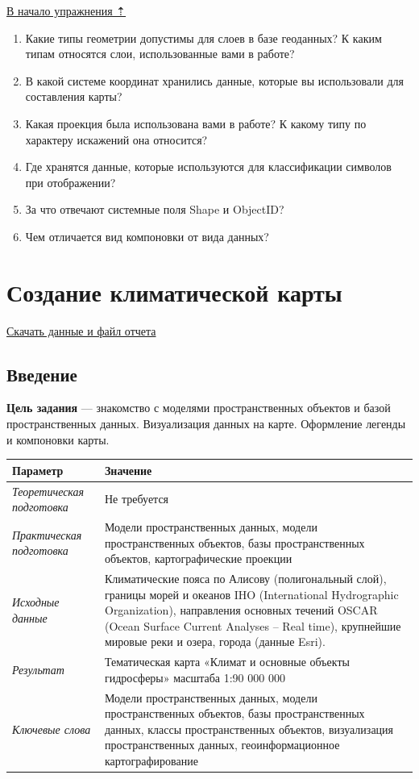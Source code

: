 \documentclass[12pt,]{book}
\begin{document}
\protect\hyperlink{map-design-general}{В начало упражнения ⇡}

\begin{enumerate}
\def\labelenumi{\arabic{enumi}.}
\item
  Какие типы геометрии допустимы для слоев в базе геоданных? К каким типам относятся слои, использованные вами в работе?
\item
  В какой системе координат хранились данные, которые вы использовали для составления карты?
\item
  Какая проекция была использована вами в работе? К какому типу по характеру искажений она относится?
\item
  Где хранятся данные, которые используются для классификации символов при отображении?
\item
  За что отвечают системные поля Shape и ObjectID?
\item
  Чем отличается вид компоновки от вида данных?
\end{enumerate}

\hypertarget{map-design-climates}{%
\chapter{Создание климатической карты}\label{map-design-climates}}

\href{http://autolab.geogr.msu.ru/gis/data/Ex03.zip}{Скачать данные и файл отчета}

\hypertarget{map-design-climates-intro}{%
\section{Введение}\label{map-design-climates-intro}}

\textbf{Цель задания} --- знакомство с моделями пространственных объектов и базой пространственных данных. Визуализация данных на карте. Оформление легенды и компоновки карты.

\begin{longtable}[]{@{}ll@{}}
\toprule
Параметр & Значение\tabularnewline
\midrule
\endhead
\emph{Теоретическая подготовка} & Не требуется\tabularnewline
\emph{Практическая подготовка} & Модели пространственных данных, модели пространственных объектов, базы пространственных объектов, картографические проекции\tabularnewline
\emph{Исходные данные} & Климатические пояса по Алисову (полигональный слой), границы морей и океанов IHO (International Hydrographic Organization), направления основных течений OSCAR (Ocean Surface Current Analyses -- Real time), крупнейшие мировые реки и озера, города (данные Esri).\tabularnewline
\emph{Результат} & Тематическая карта «Климат и основные объекты гидросферы» масштаба 1:90 000 000\tabularnewline
\emph{Ключевые слова} & Модели пространственных данных, модели пространственных объектов, базы пространственных данных, классы пространственных объектов, визуализация пространственных данных, геоинформационное картографирование\tabularnewline
\bottomrule
\end{longtable}
\end{document}

